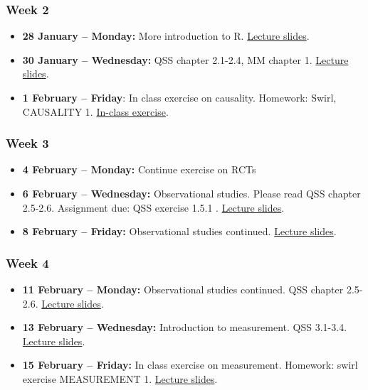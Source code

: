 \documentclass[a4paper,12pt]{article}
\begin{document}
\subsubsection*{Week 2}

\begin{itemize}
	\item \textbf{28 January -- Monday:} More introduction to R. \href{https://pols1600.github.io/slides/week02a/week02a.html}{Lecture slides}.
	\item \textbf{30 January -- Wednesday:}  QSS chapter 2.1-2.4, MM chapter 1. \href{https://pols1600.github.io/slides/week02b/week02b.html}{Lecture slides}.
	\item \textbf{1 February -- Friday}: In class exercise on causality. Homework: Swirl, CAUSALITY 1. \href{https://raw.githubusercontent.com/pols1600/pols1600.github.io/master/slides/week02c/leader-assassination.Rmd}{In-class exercise}.
\end{itemize}

\subsubsection*{Week 3} 

\begin{itemize}
	\item \textbf{4 February -- Monday:} Continue exercise on RCTs
	\item \textbf{6 February -- Wednesday:} Observational studies. Please read QSS chapter 2.5-2.6. Assignment due: QSS exercise 1.5.1 . \href{https://pols1600.github.io/slides/week03b/week03b.html}{Lecture slides}.
	\item \textbf{8 February -- Friday:} Observational studies continued. \href{https://pols1600.github.io/slides/week03c/week03c.html}{Lecture slides}.
\end{itemize}

\subsubsection*{Week 4}

\begin{itemize}
	\item \textbf{11 February -- Monday:} Observational studies continued. QSS chapter 2.5-2.6. \href{https://pols1600.github.io/slides/week04a/week04a.html}{Lecture slides}.
	\item \textbf{13 February -- Wednesday:} Introduction to measurement. QSS 3.1-3.4. \href{https://pols1600.github.io/slides/week04b/week04b.html}{Lecture slides}.
	\item \textbf{15 February -- Friday:} In class exercise on measurement. Homework: swirl exercise MEASUREMENT 1. \href{https://pols1600.github.io/slides/week04c/week04c.html}{Lecture slides}.
\end{itemize}
\end{document}
